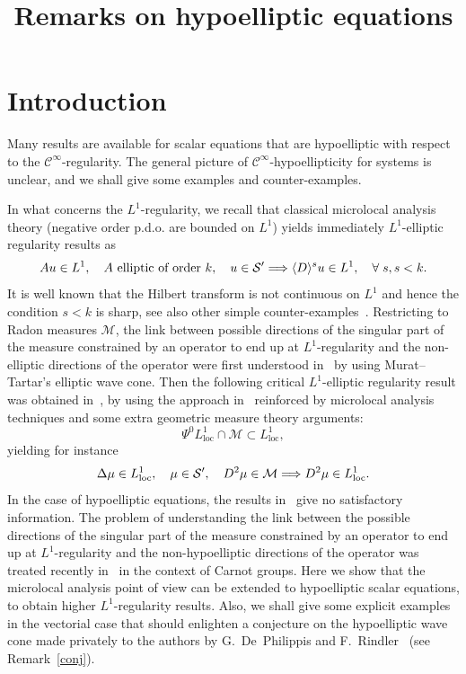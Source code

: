 \documentclass[AHL,Unicode,longabstracts,published]{cedram}
\title{Remarks on hypoelliptic equations}
\author[\initial{V.} \lastname{Banica}]{\firstname{Valeria} \lastname{Banica}}
\author[\initial{N.} \lastname{Burq}]{\firstname{Nicolas} \lastname{Burq}}
\DeclareMathOperator{\locc}{loc}
\newcommand{\clC}{\mathcal{C}}
\newcommand{\clS}{\mathcal{S}}
\newcommand{\clM}{\mathcal{M}}
\renewcommand*{\implies}{\mathchoice{\Longrightarrow}{\Rightarrow}{\Rightarrow}{\Rightarrow}}
\let\oldforall\forall
\renewcommand*{\forall}{\mathrel{\oldforall}}
\begin{document}
\maketitle

\section{Introduction}

Many results are available for scalar equations that are hypoelliptic with respect to the $\clC^\infty$-regularity. The general picture of $\clC^\infty$-hypoellipticity for systems is unclear, and we shall give some examples and counter-examples.


In what concerns the $L^1$-regularity, we recall that classical microlocal analysis theory (negative order p.d.o. are bounded on $L^1$) yields immediately $L^1$-elliptic regularity results as
\[
Au\in L^1,\quad A \text{ elliptic of order } k,\quad u\in \clS'\implies \langle D\rangle^s u\in L^1, \quad\forall s, s<k.
\]
It is well known that the Hilbert transform is not continuous on $L^1$ and hence the condition $s<k$ is sharp, see also other simple counter-examples~\cite[Example~7.5]{GM}. Restricting to Radon measures $\clM$, the link between possible directions of the singular part of the measure constrained by an operator to end up at $L^1$-regularity and the non-elliptic directions of the operator were first understood in~\cite{DePRi} by using Murat--Tartar's elliptic wave cone. Then the following critical $L^1$-elliptic regularity result was obtained in~\cite{BBWFL1}, by using the approach in~\cite{DePRi} reinforced by microlocal analysis techniques and some extra geometric measure theory arguments:
\begin{equation}\label{psi0L1}
\Psi^0L^1_{\locc}\cap\clM\subset L^1_{\locc},
\end{equation}
yielding for instance
\[
\Delta\mu\in L_{\locc}^1,\quad \mu\in \clS',\quad D^2\mu\in \clM\implies D^2\mu\in L^1_{\locc}.
\]
In the case of hypoelliptic equations, the results in~\cite{BBWFL1,DePRi} give no satisfactory information. The problem of understanding the link between the possible directions of the singular part of the measure constrained by an operator to end up at $L^1$-regularity and the non-hypoelliptic directions of the operator was treated recently in~\cite{A-sandwich} in the context of Carnot groups. Here we show that the microlocal analysis point of view can be extended to hypoelliptic scalar equations, to obtain higher $L^1$-regularity results. Also, we shall give some explicit examples in the vectorial case that should enlighten a conjecture on the hypoelliptic wave cone made privately to the authors by G.~De~Philippis and F.~Rindler~\cite{DePRiprep} (see Remark~\ref{conj}).
\end{document}
